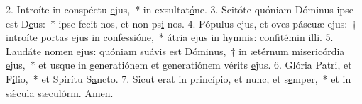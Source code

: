 2. Introíte in conspéctu \uline{e}jus,~* in exsultat\uline{ó}ne.
3. Scitóte quóniam Dóminus ipse est D\uline{e}us:~* ipse fecit nos, et non ps\uline{i} nos.
4. Pópulus ejus, et oves páscuæ ejus:~† introíte portas ejus in confessi\uline{ó}ne,~* átria ejus in hymnis: confitémin \uline{i}lli.
5. Laudáte nomen ejus: quóniam suávis est Dóminus,~† in ætérnum misericórdia \uline{e}jus,~* et usque in generatiónem et generatiónem vérits \uline{e}jus.
6. Glória Patri, et F\uline{í}lio,~* et Spirítu S\uline{a}ncto.
7. Sicut erat in princípio, et nunc, et s\uline{e}mper,~* et in sǽcula sæculórm. \uline{A}men.
